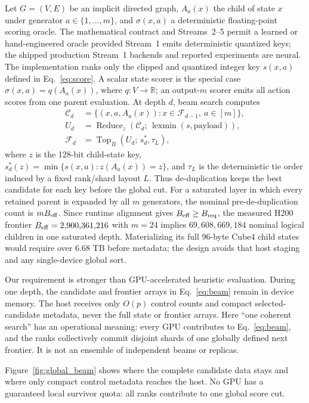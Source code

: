\documentclass[10pt,twocolumn]{article}
\newcommand{\beam}{B}
\newcommand{\frontier}{\mathcal{F}}
\newcommand{\cand}{\mathcal{C}}
\begin{document}
Let $G=(V,E)$ be an implicit directed graph, $A_a(x)$ the child of state $x$
under generator $a\in\{1,\ldots,m\}$, and $\sigma(x,a)$ a deterministic
floating-point scoring oracle.  The mathematical contract and Streams~2--5
permit a learned or hand-engineered oracle provided Stream~1 emits deterministic
quantized keys; the shipped production Stream~1 backends and reported
experiments are neural.  The implementation ranks only the clipped and
quantized integer key $s(x,a)$ defined in Eq.~\eqref{eq:score}.  A
scalar state scorer is the special case $\sigma(x,a)=q(A_a(x))$, where
$q:V\rightarrow\mathbb{R}$; an output-$m$ scorer emits all action scores from
one parent evaluation.  At depth $d$, beam search computes
\begin{align}
  \cand_d &= \{(x,a,A_a(x)):x\in\frontier_{d-1},\ a\in[m]\},\nonumber\\
  U_d &= \operatorname{Reduce}_{z}
  (\cand_d;\,\operatorname{lexmin}(s,\mathrm{payload})),\\
  \frontier_d &= \operatorname{Top}_{\beam}
  \left(U_d;\,s_d^*,\tau_L\right),
  \label{eq:beam}
\end{align}
where $z$ is the 128-bit child-state key,
$s_d^*(z)=\min\{s(x,a):z(A_a(x))=z\}$, and $\tau_L$ is the
deterministic tie order induced by a fixed rank/shard layout $L$.  Thus
de-duplication keeps the best candidate for each key before the global cut.
For a saturated layer in which every retained parent is expanded by all $m$
generators, the nominal pre-de-duplication count is $m\beam_{\rm eff}$.  Since
runtime alignment gives $\beam_{\rm eff}\geq\beam_{\rm req}$, the measured
H200 frontier $\beam_{\rm eff}=2{,}900{,}361{,}216$ with $m=24$ implies
$69{,}608{,}669{,}184$ nominal logical children in one saturated depth.
Materializing its full 96-byte Cube4 child states would require over
$6.68$ TB before metadata; the design avoids that host staging and any
single-device global sort.

Our requirement is stronger than GPU-accelerated heuristic evaluation.  During
one depth, the candidate and frontier arrays in Eq.~\eqref{eq:beam} remain in
device memory.  The host receives only $O(p)$ control counts and compact
selected-candidate metadata, never the full state or frontier arrays.
Here ``one coherent search'' has an operational meaning: every GPU contributes
to Eq.~\eqref{eq:beam}, and the ranks collectively commit disjoint shards of
one globally defined next frontier.  It is not an ensemble of independent
beams or replicas.

Figure~\ref{fig:global_beam} shows where the complete candidate data stays and
where only compact control metadata reaches the host. No GPU has a guaranteed
local survivor quota: all ranks contribute to one global score cut.
\end{document}
